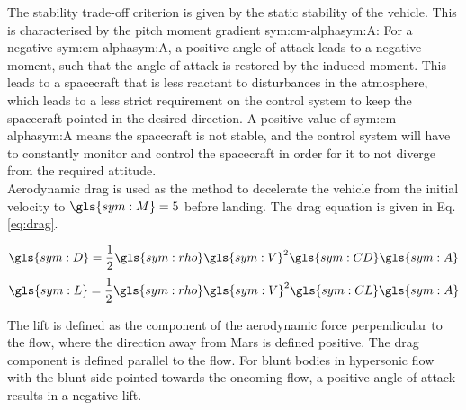 The stability trade-off criterion is given by the static stability of the vehicle. This is characterised by the pitch moment gradient \gls{sym:cm-alpha}\gls{sym:A}: For a negative \gls{sym:cm-alpha}\gls{sym:A}, a positive angle of attack leads to a negative moment, such that the angle of attack is restored by the induced moment. This leads to a spacecraft that is less reactant to disturbances in the atmosphere, which leads to a less strict requirement on the control system to keep the spacecraft pointed in the desired direction. A positive value of \gls{sym:cm-alpha}\gls{sym:A} means the spacecraft is not stable, and the control system will have to constantly monitor and control the spacecraft in order for it to not diverge from the required attitude. \\


Aerodynamic drag is used as the method to decelerate the vehicle from the initial velocity to $\gls{sym:M}=5$ before landing. The drag equation is given in Eq. \ref{eq:drag}.

\begin{equation} \label{eq:drag}
\gls{sym:D} = \frac{1}{2}\gls{sym:rho}\gls{sym:V}^2\gls{sym:CD}\gls{sym:A}
\end{equation}
\begin{equation} \label{eq:lift}
\gls{sym:L} = \frac{1}{2}\gls{sym:rho}\gls{sym:V}^2\gls{sym:CL}\gls{sym:A}
\end{equation}

The lift is defined as the component of the aerodynamic force perpendicular to the flow, where the direction away from Mars is defined positive. The drag component is defined parallel to the flow. For blunt bodies in hypersonic flow with the blunt side pointed towards the oncoming flow, a positive angle of attack results in a negative lift.

